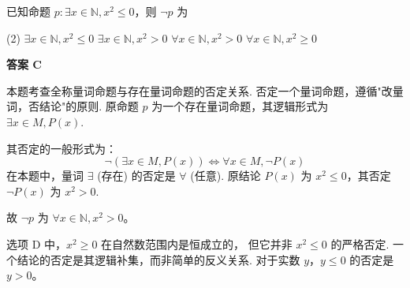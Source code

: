 \begin{choice}[topic={量词命题的否定}]
已知命题 $p: \exists x \in \mathbb{N}, x^2 \le 0$，则 $\neg p$ 为
\begin{tasks}(2)
	\task $\exists x \in \mathbb{N}, x^2 \le 0$
	\task $\exists x \in \mathbb{N}, x^2 > 0$
	\task $\forall x \in \mathbb{N}, x^2 > 0$
	\task $\forall x \in \mathbb{N}, x^2 \ge 0$
\end{tasks}
\end{choice}
\begin{choice-sol}
\textbf{答案 C}

本题考查全称量词命题与存在量词命题的否定关系.
否定一个量词命题，遵循"改量词，否结论"的原则.
原命题 $p$ 为一个存在量词命题，其逻辑形式为 $\exists x \in M, P(x)$.

其否定的一般形式为：
\[ \neg (\exists x \in M, P(x)) \iff \forall x \in M, \neg P(x) \]
在本题中，量词 $\exists$ (存在) 的否定是 $\forall$ (任意).
原结论 $P(x)$ 为 $x^2 \le 0$，其否定 $\neg P(x)$ 为 $x^2 > 0$.

故 $\neg p$ 为 $\forall x \in \mathbb{N}, x^2 > 0$。

\begin{note}
选项 D 中，$x^2 \ge 0$ 在自然数范围内是恒成立的，
但它并非 $x^2 \le 0$ 的严格否定.
一个结论的否定是其逻辑补集，而非简单的反义关系.
对于实数 $y$，$y \le 0$ 的否定是 $y>0$。
\end{note}
\end{choice-sol}
